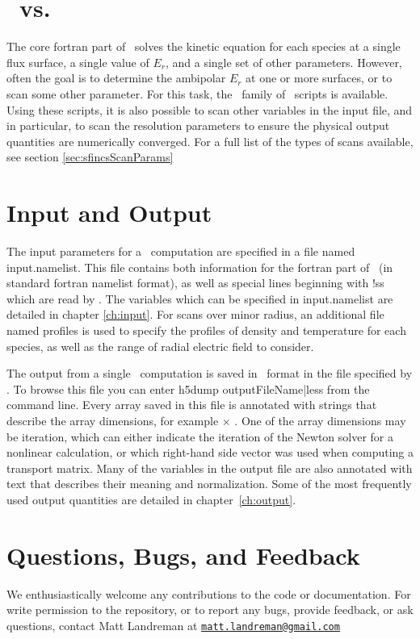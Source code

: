 \section{\sfincs~vs. \sfincsScan}
The core fortran part of \sfincs~solves the kinetic equation for each species
at a single flux surface, a single value of $E_r$, and a single set of other parameters.
However, often the goal is to determine the ambipolar $E_r$ at one or more surfaces, or to scan some other parameter.
For this task, the \sfincsScan~family of \python~scripts is available.
Using these scripts, it is also possible to scan other variables in the input file,
and in particular, to scan the resolution parameters to ensure
the physical output quantities are numerically converged.
For a full list of the types of scans available, see section \ref{sec:sfincsScanParams}

\section{Input and Output}

The input parameters for a \sfincs~computation are specified in a file named {\ttfamily input.namelist}.
This file contains both information for the fortran part of \sfincs~(in standard fortran namelist format),
as well as special lines beginning with {\ttfamily !ss} which are read by \sfincsScan.
The variables which can be specified in {\ttfamily input.namelist} are detailed in chapter \ref{ch:input}.
For scans over minor radius, an additional file named {\ttfamily profiles} is used to specify the profiles of density and temperature
for each species, as well as the range of radial electric field to consider.

The output from a single \sfincs~computation is saved in \HDF~format in the file %
specified by .
To browse this file you can enter {\ttfamily h5dump outputFileName|less} %
from the command line.
Every array saved in this file is annotated with strings that describe the array dimensions,
for example \Ntheta$\times$ \Nzeta. One of the array dimensions may be {\ttfamily iteration},
which can either indicate the iteration of the Newton solver for a nonlinear calculation,
or which right-hand side vector was used when computing a transport matrix.
Many of the variables in the output file are also annotated with
text that describes their meaning and normalization. 
Some of the most frequently used output quantities are detailed in chapter~\ref{ch:output}.

\section{Questions, Bugs, and Feedback}

We enthusiastically welcome any contributions to the code or documentation.
For write permission to the repository, or to report any bugs, provide feedback, or ask questions, contact Matt Landreman at
\href{mailto:matt.landreman@gmail.com}{\nolinkurl{matt.landreman@gmail.com} }


